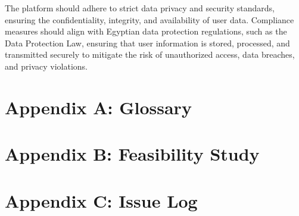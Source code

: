 \documentclass[titlepage]{article}
\begin{document}
The platform should adhere to strict data privacy and security standards, ensuring the confidentiality, integrity, and availability of user data.
Compliance measures should align with Egyptian data protection regulations, such as the Data Protection Law, ensuring that user information is stored, processed, and transmitted securely to mitigate the risk of unauthorized access, data breaches, and privacy violations.
\appendix
\section{Appendix A: Glossary}
\section{Appendix B: Feasibility Study}
\section{Appendix C: Issue Log}
\end{document}
